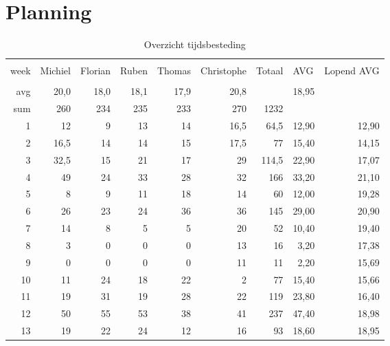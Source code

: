 \documentclass[12pt,a4paper]{report}
\begin{document}
\chapter{Planning}

\label{appendix:planning}


\begin{longtable}{rrrrrrrrr}
\caption{Overzicht tijdsbesteding} \\
\hline \\[-2ex]
  \multicolumn{1}{l}{week } & 
  \multicolumn{1}{l}{Michiel} &
  \multicolumn{1}{l}{Florian} &
  \multicolumn{1}{l}{Ruben} &
  \multicolumn{1}{l}{Thomas}&
  \multicolumn{1}{l}{Christophe}&
  \multicolumn{1}{l}{Totaal}&
  \multicolumn{1}{l}{AVG}&
  \multicolumn{1}{l}{Lopend AVG}
  \\[0.5ex] \hline \\[-1.8ex]
\endfirsthead
\hline
avg & 20,0 & 18,0 & 18,1 & 17,9 & 20,8 &  & 18,95 & \\
\hline
sum & 260 & 234 & 235 & 233 & 270 & 1232 & & \\
\hline
1 & 12 & 9 & 13 & 14 & 16,5 & 64,5 & 12,90 & 12,90 \\
2 & 16,5 & 14 & 14 & 15 & 17,5 & 77 & 15,40 & 14,15 \\
3 & 32,5 & 15 & 21 & 17 & 29 & 114,5 & 22,90 & 17,07 \\
4 & 49 & 24 & 33 & 28 & 32 & 166 & 33,20 & 21,10 \\
5 & 8 & 9 & 11 & 18 & 14 & 60 & 12,00 & 19,28 \\
6 & 26 & 23 & 24 & 36 & 36 & 145 & 29,00 & 20,90 \\
7 & 14 & 8 & 5 & 5 & 20 & 52 & 10,40 & 19,40 \\
8 & 3 & 0 & 0 & 0 & 13 & 16 & 3,20 & 17,38 \\
9 & 0 & 0 & 0 & 0 & 11 & 11 & 2,20 & 15,69 \\
10 & 11 & 24 & 18 & 22 & 2 & 77 & 15,40 & 15,66 \\
11 & 19 & 31 & 19 & 28 & 22 & 119 & 23,80 & 16,40 \\
12 & 50 & 55 & 53 & 38 & 41 & 237 & 47,40 & 18,98 \\
13 & 19 & 22 & 24 & 12 & 16 & 93 & 18,60 & 18,95 \\
\hline
\end{longtable}\normalsize
\end{document}
